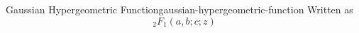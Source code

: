 \begin{definition}{Gaussian Hypergeometric Function}{gaussian-hypergeometric-function}
  Written as \[_2F_1(a, b; c; z)\]
\end{definition}
